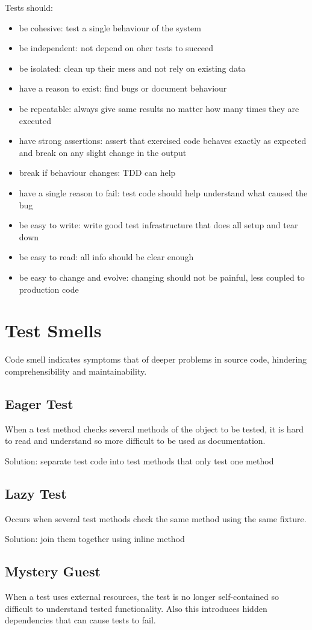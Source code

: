 \documentclass[11pt]{article}
\begin{document}
Tests should:
\begin{itemize}
\item be cohesive: test a single behaviour of the system
\item be independent: not depend on oher tests to succeed
\item be isolated: clean up their mess and not rely on
existing data
\item have a reason to exist: find bugs or document behaviour
\item be repeatable: always give same results no matter how
many times they are executed
\item have strong assertions: assert that exercised code
behaves exactly as expected and break on any slight
change in the output
\item break if behaviour changes: TDD can help
\item have a single reason to fail: test code should help
understand what caused the bug
\item be easy to write: write good test infrastructure
that does all setup and tear down
\item be easy to read: all info should be clear enough
\item be easy to change and evolve: changing should not
be painful, less coupled to production code
\end{itemize}
\section{Test Smells}
\label{sec:orga0d6062}
Code smell indicates symptoms that of deeper problems in
source code, hindering comprehensibility and maintainability.
\subsection{Eager Test}
\label{sec:org2227ac9}
When a test method checks several methods of the object
to be tested, it is hard to read and understand so more
difficult to be used as documentation.

Solution: separate test code into test methods that only
test one method
\subsection{Lazy Test}
\label{sec:org00c1974}
Occurs when several test methods check the same method
using the same fixture.

Solution: join them together using inline method
\subsection{Mystery Guest}
\label{sec:org4400d37}
When a test uses external resources, the test is no longer
self-contained so difficult to understand tested
functionality.
Also this introduces hidden dependencies that can cause
tests to fail.
\end{document}
